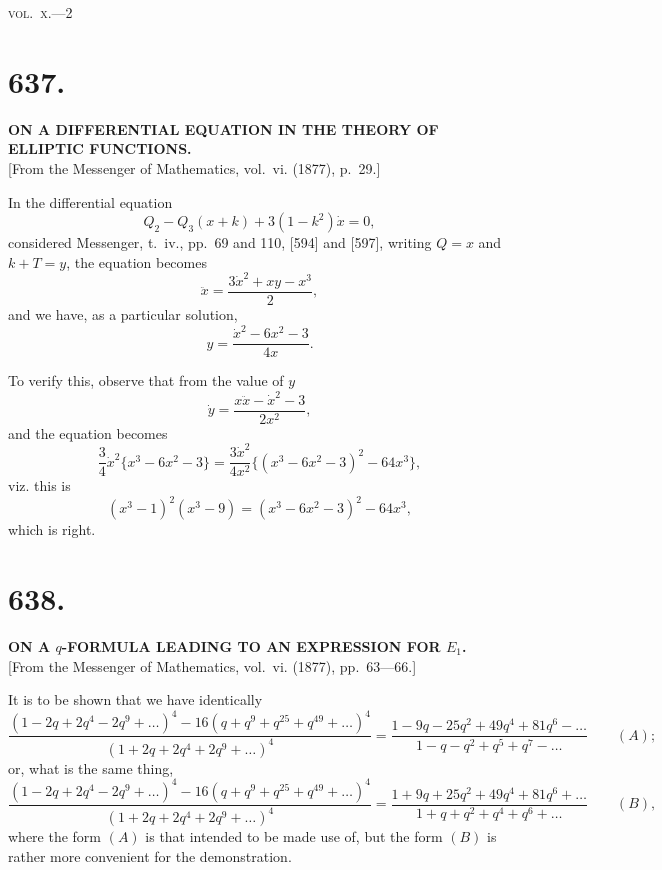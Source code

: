 \documentclass[12pt,a4paper]{article}
\theoremstyle{plain}
\theoremstyle{definition}
\theoremstyle{remark}
\begin{document}
\hfill\textsc{vol.~x.}---2

\clearpage
\setcounter{page}{24}

\section*{637.}

\begin{center}
\textbf{ON A DIFFERENTIAL EQUATION IN THE THEORY OF ELLIPTIC FUNCTIONS.}\\[1em]
[From the Messenger of Mathematics, vol.~vi. (1877), p.~29.]
\end{center}

In the differential equation
\[
Q_2 - Q_3(x + k) + 3(1-k^2)\dot{x} = 0,
\]
considered Messenger, t.~iv., pp.~69 and 110, [594] and [597], writing $Q = x$ and $k + T = y$, the equation becomes
\[
\ddot{x} = \frac{3\dot{x}^2 + xy - x^3}{2},
\]
and we have, as a particular solution,
\[
y = \frac{\dot{x}^2 - 6x^2 - 3}{4x}.
\]

To verify this, observe that from the value of $y$
\[
\dot{y} = \frac{x\ddot{x} - \dot{x}^2 - 3}{2x^2},
\]
and the equation becomes
\[
\frac{3}{4}\dot{x}^2 \{x^3 - 6x^2 - 3\} = \frac{3\dot{x}^2}{4x^2}\{(x^3 - 6x^2 - 3)^2 - 64x^3\},
\]
viz. this is
\[
(x^3-1)^2(x^3-9) = (x^3 - 6x^2 - 3)^2 - 64x^3,
\]
which is right.

\clearpage
\setcounter{page}{25}

\section*{638.}

\begin{center}
\textbf{ON A $q$-FORMULA LEADING TO AN EXPRESSION FOR $E_1$.}\\[1em]
[From the Messenger of Mathematics, vol.~vi. (1877), pp.~63---66.]
\end{center}

It is to be shown that we have identically
\[
\frac{(1-2q+2q^4-2q^9+\ldots)^4 - 16(q+q^9+q^{25}+q^{49}+\ldots)^4}{(1+2q+2q^4+2q^9+\ldots)^4} = \frac{1 - 9q - 25q^2 + 49q^4 + 81q^6 - \ldots}{1 - q - q^2 + q^5 + q^7 - \ldots} \qquad (A);
\]
or, what is the same thing,
\[
\frac{(1-2q+2q^4-2q^9+\ldots)^4 - 16(q+q^9+q^{25}+q^{49}+\ldots)^4}{(1+2q+2q^4+2q^9+\ldots)^4} = \frac{1 + 9q + 25q^2 + 49q^4 + 81q^6 + \ldots}{1 + q + q^2 + q^4 + q^6 + \ldots} \qquad (B),
\]
where the form $(A)$ is that intended to be made use of, but the form $(B)$ is rather more convenient for the demonstration.
\end{document}
